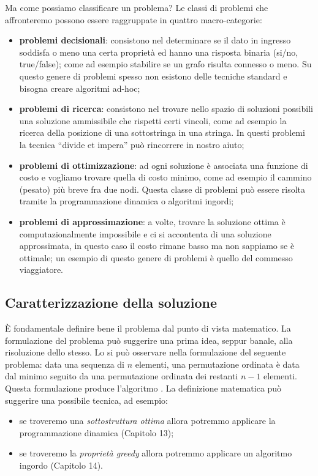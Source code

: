 Ma come possiamo classificare un problema?
Le classi di problemi che affronteremo possono essere raggruppate in quattro macro-categorie:
\begin{itemize}
	\item \textbf{problemi decisionali}: consistono nel determinare se il dato in ingresso soddisfa o meno una certa proprietà ed hanno una risposta binaria (si/no, true/false); come ad esempio stabilire se un grafo risulta connesso o meno.
	Su questo genere di problemi spesso non esistono delle tecniche standard e bisogna creare algoritmi ad-hoc;
	\item \textbf{problemi di ricerca}: consistono nel trovare nello spazio di soluzioni possibili una soluzione ammissibile che rispetti certi vincoli, come ad esempio la ricerca della posizione di una sottostringa in una stringa.
	In questi problemi la tecnica \enquote{divide et impera} può rincorrere in nostro aiuto;
	\item \textbf{problemi di ottimizzazione}: ad ogni soluzione è associata una funzione di costo e vogliamo trovare quella di costo minimo, come ad esempio il cammino (pesato) più breve fra due nodi.
	Questa classe di problemi può essere risolta tramite la programmazione dinamica o algoritmi ingordi;
	\item \textbf{problemi di approssimazione}: a volte, trovare la soluzione ottima è computazionalmente impossibile e ci si accontenta di una soluzione approssimata, in questo caso il costo rimane basso ma non sappiamo se è ottimale; un esempio di questo genere di problemi è quello del commesso viaggiatore.
\end{itemize}

\subsection{Caratterizzazione della soluzione}

\`{E} fondamentale definire bene il problema dal punto di vista matematico.
La formulazione del problema può suggerire una prima idea, seppur banale, alla risoluzione dello stesso.
Lo si può osservare nella formulazione del seguente problema: data una sequenza di \(n\) elementi, una permutazione ordinata è data dal minimo seguito da una permutazione ordinata dei restanti \(n-1\) elementi.
Questa formulazione produce l'algoritmo \selectionSort.
La definizione matematica può suggerire una possibile tecnica, ad esempio:
\begin{itemize}
	\item se troveremo una \emph{sottostruttura ottima} allora potremmo applicare la programmazione dinamica (Capitolo 13);
	\item se troveremo la \emph{proprietà greedy} allora potremmo applicare un algoritmo ingordo (Capitolo 14).
\end{itemize}

